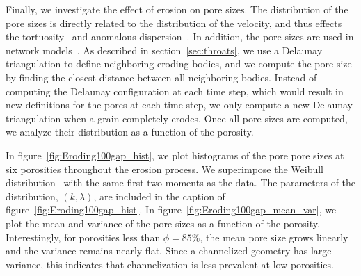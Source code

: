 \documentclass{jfm}
\begin{document}
Finally, we investigate the effect of erosion on pore sizes.  The
distribution of the pore sizes is directly related to the distribution
of the velocity, and thus effects the tortuosity~\citep{den-ica-hid2018}
and anomalous dispersion~\citep{dea-qua-bir-jua2018}. In addition, the
pore sizes are used in network models~\citep{bry-mel-cad1993,
bry-kin-mel1993}.  As described in section~\ref{sec:throats}, we use a
Delaunay triangulation to define neighboring eroding bodies, and we
compute the pore size by finding the closest distance between all
neighboring bodies.  Instead of computing the Delaunay configuration at
each time step, which would result in new definitions for the pores at
each time step, we only compute a new Delaunay triangulation when a
grain completely erodes.  Once all pore sizes are computed, we analyze
their distribution as a function of the porosity.  

In figure~\ref{fig:Eroding100gap_hist}, we plot histograms of the pore
pore sizes at six porosities throughout the erosion process. We
superimpose the Weibull distribution~\citep{ioa-cha1993} with the same
first two moments as the data.  The parameters of the distribution,
$(k,\lambda)$, are included in the caption of
figure~\ref{fig:Eroding100gap_hist}.  In
figure~\ref{fig:Eroding100gap_mean_var}, we plot the mean and variance
of the pore sizes as a function of the porosity.  Interestingly, for
porosities less than $\phi = 85\%$, the mean pore size grows linearly
and the variance remains nearly flat. Since a channelized geometry has
large variance, this indicates that channelization is less prevalent at
low porosities.
\end{document}
